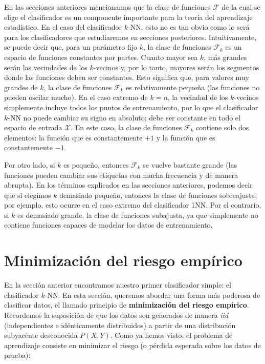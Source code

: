 \documentclass{report}
\begin{document}
En las secciones anteriores mencionamos que la clase de funciones \(\mathcal{F}\) de la cual se elige el clasificador 
es un componente importante para la teoría del aprendizaje estadístico. En el caso del clasificador \(k\)-NN, 
esto no es tan obvio como lo será para los clasificadores que estudiaremos en secciones posteriores. 
Intuitivamente, se puede decir que, para un parámetro fijo \(k\), la clase de funciones \(\mathcal{F}_k\) es un espacio 
de funciones constantes por partes. Cuanto mayor sea \(k\), más grandes serán las vecindades de los \(k\)-vecinos 
y, por lo tanto, mayores serán los segmentos donde las funciones deben ser constantes. Esto significa que, 
para valores muy grandes de \(k\), la clase de funciones \(\mathcal{F}_k\) es relativamente pequeña (las funciones no 
pueden oscilar mucho). En el caso extremo de \(k = n\), la vecindad de los \(k\)-vecinos simplemente incluye 
todos los puntos de entrenamiento, por lo que el clasificador \(k\)-NN no puede cambiar su signo en absoluto; 
debe ser constante en todo el espacio de entrada \(\mathcal{X}\). En este caso, la clase de funciones \(\mathcal{F}_k\) contiene solo 
dos elementos: la función que es constantemente \(+1\) y la función que es constantemente \(-1\).\newline

Por otro lado, si \(k\) es pequeño, entonces \(\mathcal{F}_k\) se vuelve bastante grande (las funciones pueden cambiar sus 
etiquetas con mucha frecuencia y de manera abrupta). En los términos explicados en las secciones anteriores, 
podemos decir que si elegimos \(k\) demasiado pequeño, entonces la clase de funciones sobreajusta; 
por ejemplo, esto ocurre en el caso extremo del clasificador 1NN. Por el contrario, si \(k\) es demasiado grande, 
la clase de funciones subajusta, ya que simplemente no contiene funciones capaces de modelar los 
datos de entrenamiento.

\section{Minimización del riesgo empírico}

En la sección anterior encontramos nuestro primer clasificador simple: el clasificador \(k\)-NN. En esta sección, 
queremos abordar una forma más poderosa de clasificar datos, el llamado principio de \textbf{minimización 
del riesgo empírico}. Recordemos la suposición de que los datos son generados de manera \textit{iid} 
(independientes e idénticamente distribuidos) a partir de una distribución subyacente desconocida \(P(X, Y)\). 
Como ya hemos visto, el problema de aprendizaje consiste en minimizar el riesgo (o pérdida esperada sobre 
los datos de prueba):
\end{document}
